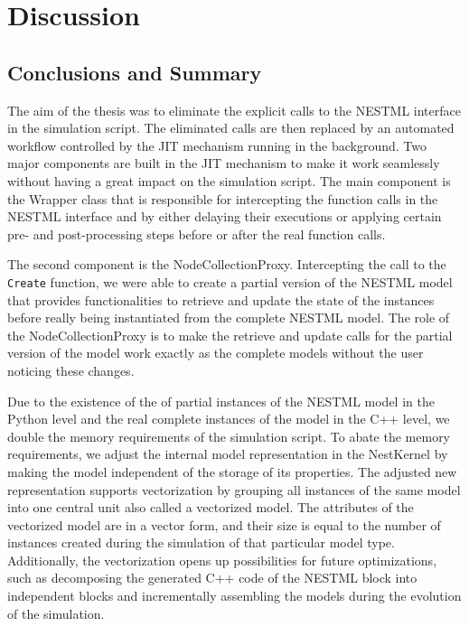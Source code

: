 \chapter{Discussion}
 \label{chap:disc}
 \section{Conclusions and Summary}

The aim of the thesis was to eliminate the explicit calls to the NESTML interface in the simulation script. The eliminated calls are then replaced by an automated workflow controlled by the JIT mechanism running in the background. Two major components are built in the JIT mechanism to make it work seamlessly without having a great impact on the simulation script. The main component is the Wrapper class that is responsible for intercepting the function calls in the NESTML interface and by either delaying their executions or applying certain pre- and post-processing steps before or after the real function calls.

The second component is the NodeCollectionProxy. Intercepting the call to the \texttt{Create} function, we were able to create a partial version of the NESTML model that provides functionalities to retrieve and update the state of the instances before really being instantiated from the complete NESTML model. The role of the NodeCollectionProxy is to make the retrieve and update calls for the partial version of the model work exactly as the complete models without the user noticing these changes. 

Due to the existence of the of partial instances of the NESTML model in the Python level and the real complete instances of the model in the C++ level, we double the memory requirements of the simulation script. To abate the memory requirements, we adjust the internal model representation in the NestKernel by making the model independent of the storage of its properties. The adjusted new representation supports vectorization by grouping all instances of the same model into one central unit also called a vectorized model. The attributes of the vectorized model are in a vector form, and their size is equal to the number of instances created during the simulation of that particular
model type. Additionally, the vectorization opens up possibilities for future optimizations, such as decomposing the generated C++ code of the NESTML block into independent blocks and incrementally assembling the models during the evolution of the simulation.

